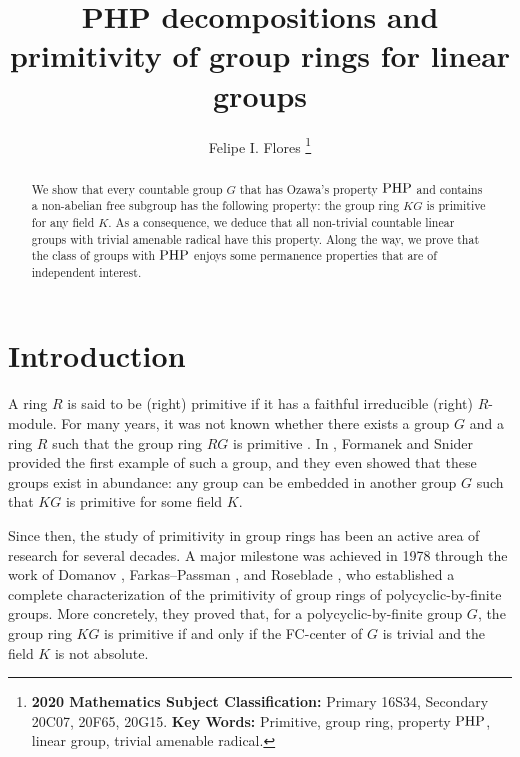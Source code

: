 \documentclass[11pt]{article}
\date{}
\theoremstyle{definition}
\theoremstyle{remark}
\numberwithin{equation}{section}
\numberwithin{equation}{section}
\numberwithin{equation}{section}
\begin{document}
\title{{\rm PHP} decompositions and primitivity of group rings for linear groups}


\author{Felipe I. Flores
\footnote{
\textbf{2020 Mathematics Subject Classification:} Primary 16S34, Secondary 20C07, 20F65, 20G15.
\newline
\textbf{Key Words:} Primitive, group ring, property $\rm PHP$, linear group, trivial amenable radical.}
}

\maketitle


\begin{abstract}\setlength{\parindent}{0pt}\setlength{\parskip}{1ex}\noindent
We show that every countable group $G$ that has Ozawa's property $\rm PHP$ and contains a non-abelian free subgroup has the following property: the group ring $KG$ is primitive for any field $K$. As a consequence, we deduce that all non-trivial countable linear groups with trivial amenable radical have this property. Along the way, we prove that the class of groups with $\rm PHP$ enjoys some permanence properties that are of independent interest.
\end{abstract}



\section{Introduction}

A ring $R$ is said to be (right) primitive if it has a faithful irreducible (right) $R$-module. For many years, it was not known whether there exists a group $G$ and a ring $R$ such that the group ring $RG$ is primitive \cite[Problem 17]{Ka70}. In \cite{FoSn72}, Formanek and Snider provided the first example of such a group, and they even showed that these groups exist in abundance: any group can be embedded in another group $G$ such that $KG$ is primitive for some field $K$.

Since then, the study of primitivity in group rings has been an active area of research for several decades. A major milestone was achieved in 1978 through the work of Domanov \cite{Do78}, Farkas–Passman \cite{FaPa78}, and Roseblade \cite{Ro78,Ro79}, who established a complete characterization of the primitivity of group rings of polycyclic-by-finite groups. More concretely, they proved that, for a polycyclic-by-finite group $G$, the group ring $KG$ is primitive if and only if the FC-center of $G$ is trivial and the field $K$ is not absolute.
\end{document}
